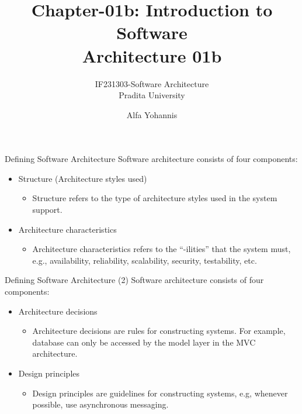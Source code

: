 \documentclass[aspectratio=169, table]{beamer}
\title{Chapter-01b: Introduction to Software \\ Architecture 01b}
\subtitle{IF231303-Software Architecture\\Pradita University}
\author{Alfa Yohannis}
\begin{document}
	
	\begin{frame}[plain]
		\maketitle
	\end{frame}
	\begin{frame}{Defining Software Architecture}
	Software architecture consists of four components:
	\begin{itemize}
		
		\item Structure (Architecture styles used)
		\begin{itemize}
			\item Structure refers to the type of architecture styles used in the system support.
		\end{itemize}
		
		\item Architecture characteristics 
		\begin{itemize}
			\item Architecture characteristics refers to the ``-ilities'' that the system must, e.g., availability, reliability, scalability, security, testability, etc. 
		\end{itemize}
		
		
	\end{itemize}
\end{frame}
	
	\begin{frame}{Defining Software Architecture (2)}
		Software architecture consists of four components:
		\begin{itemize}
			
			
			\item Architecture decisions
			\begin{itemize}
				\item Architecture decisions are rules for constructing systems. For example, database can only be accessed by the model layer in the MVC architecture.
			\end{itemize}
			
			\item Design principles
			\begin{itemize}
				\item Design principles are guidelines for constructing systems, e.g, whenever possible, use asynchronous messaging.
			\end{itemize}
			
		\end{itemize}
	\end{frame}
	
\end{document}
